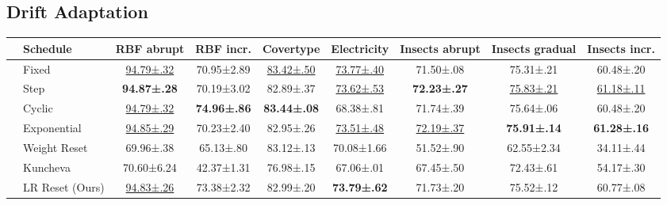 \documentclass[runningheads]{llncs}
\begin{document}
\subsection{Drift Adaptation}

\begin{table}[ht]
	\centering
	\small
	\begin{tabular}{llccccccc}
		\toprule
		                                                    & Schedule        & RBF abrupt            & RBF incr.           & Covertype             & Electricity           & Insects abrupt        & Insects gradual       & Insects incr.         \\
		\midrule
		\multirow{4}{*}{\rotatebox[origin=c]{90}{Static}}   & Fixed           & \underline{94.79±.32} & 70.95±2.89          & \underline{83.42±.50} & \underline{73.77±.40} & 71.50±.08             & 75.31±.21             & 60.48±.20             \\
		                                                    & Step            & \bfseries 94.87±.28   & 70.19±3.02          & 82.89±.37             & \underline{73.62±.53} & \bfseries 72.23±.27   & \underline{75.83±.21} & \underline{61.18±.11} \\
		                                                    & Cyclic          & \underline{94.79±.32} & \bfseries 74.96±.86 & \bfseries 83.44±.08   & 68.38±.81             & 71.74±.39             & 75.64±.06             & 60.48±.20             \\
		                                                    & Exponential     & \underline{94.85±.29} & 70.23±2.40          & 82.95±.26             & \underline{73.51±.48} & \underline{72.19±.37} & \bfseries 75.91±.14   & \bfseries 61.28±.16   \\ \midrule
		\multirow{4}{*}{\rotatebox[origin=c]{90}{Adaptive}} & Weight Reset    & 69.96±.38             & 65.13±.80           & 83.12±.13             & 70.08±1.66            & 51.52±.90             & 62.55±2.34            & 34.11±.44             \\
		                                                    & Kuncheva        & 70.60±6.24            & 42.37±1.31          & 76.98±.15             & 67.06±.01             & 67.45±.50             & 72.43±.61             & 54.17±.30             \\
		                                                    & LR Reset (Ours) & \underline{94.83±.26} & 73.38±2.32          & 82.99±.20             & \bfseries 73.79±.62   & 71.73±.20             & 75.52±.12             & 60.77±.08             \\

\end{tabular}
\end{table}
\end{document}
